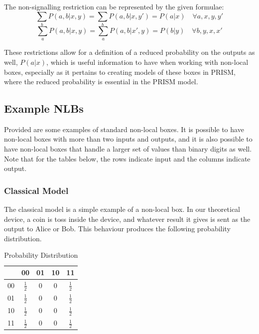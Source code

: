 \documentclass[report.tex]{subfiles}
\begin{document}
The non-signalling restriction can be represented by the given formulae:
\[\sum_{b} P(a, b | x, y) = \sum_{b} P(a, b | x, y') = P(a | x) 
\quad \forall a, x, y, y'\]
\[\sum_{a} P(a, b | x, y) = \sum_{a} P(a, b | x', y) = P(b | y) 
\quad \forall b, y, x, x'\]

These restrictions allow for a definition of a reduced probability on the
outputs as well, \(P(a | x)\), which is useful information to have when
working with non-local boxes, especially as it pertains to creating models of
these boxes in PRISM, where the reduced probability is essential in the PRISM
model.

\subsection{Example NLBs} %
\label{sub:example_nlbs}
Provided are some examples of standard non-local boxes. It is possible to have
non-local boxes with more than two inputs and outputs, and it is also possible
to have non-local boxes that handle a larger set of values than binary digits
as well. Note that for the tables below, the rows indicate input and the columns
indicate output.

\subsubsection{Classical Model} %
\label{ssub:classical_model}
The classical model is a simple example of a non-local box. In our theoretical
device, a coin is toss inside the device, and whatever result it gives is sent
as the output to Alice or Bob. This behaviour produces the following probability
distribution.

\begin{table}[H]
  \centering
  \begin{tabular}{l | c c c c}
      & 00 & 01 & 10 & 11 \\
      \hline
      00 & \(\frac{1}{2}\) & 0 & 0 & \(\frac{1}{2}\) \\
      01 & \(\frac{1}{2}\) & 0 & 0 & \(\frac{1}{2}\) \\
      10 & \(\frac{1}{2}\) & 0 & 0 & \(\frac{1}{2}\) \\
      11 & \(\frac{1}{2}\) & 0 & 0 & \(\frac{1}{2}\) \\
  \end{tabular}
  \caption{Probability Distribution}
  \label{tab:classical}
\end{table}
\end{document}
